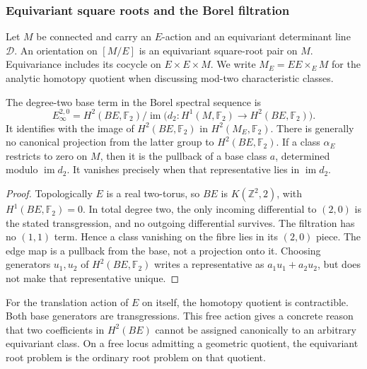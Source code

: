 \subsubsection*{Equivariant square roots and the Borel filtration}

Let \(M\) be connected and carry an \(E\)-action and an equivariant determinant line
\(\mathscr D\).  An orientation on \([M/E]\) is an equivariant
square-root pair on \(M\).  Equivariance includes its cocycle on
\(E\times E\times M\).  We write
\(M_E=EE\times_E M\) for the analytic homotopy quotient when discussing
mod-two characteristic classes.

\begin{proposition}
\label{prop:free-e-borel-class-criterion}
\label{prop:free-e-borel-vanishing-criterion}
The degree-two base term in the Borel spectral sequence is
\[
 E_\infty^{2,0}
 =H^2(BE,\mathbb F_2)/\operatorname{im}
 \bigl(d_2:H^1(M,\mathbb F_2)\to H^2(BE,\mathbb F_2)\bigr).
\]
It identifies with the image of \(H^2(BE,\mathbb F_2)\) in
\(H^2(M_E,\mathbb F_2)\).  There is generally no canonical projection
from the latter group to \(H^2(BE,\mathbb F_2)\).
If a class \(\alpha_E\) restricts to zero on \(M\), then it is the
pullback of a base class \(a\), determined modulo \(\operatorname{im}d_2\).
It vanishes precisely when that representative lies in
\(\operatorname{im}d_2\).
\end{proposition}
\begin{proof}
Topologically \(E\) is a real two-torus, so \(BE\) is
\(K(\mathbb Z^2,2)\), with \(H^1(BE,\mathbb F_2)=0\).
In total degree two, the only incoming differential to \((2,0)\) is
the stated transgression, and no outgoing differential survives.
The filtration has no \((1,1)\) term.  Hence a class vanishing on the
fibre lies in its \((2,0)\) piece.  The edge map is a pullback from the
base, not a projection onto it.  Choosing generators \(u_1,u_2\) of
\(H^2(BE,\mathbb F_2)\) writes a representative as
\(a_1u_1+a_2u_2\), but does not make that representative unique.
\end{proof}

For the translation action of \(E\) on itself, the homotopy quotient
is contractible.  Both base generators are transgressions.  This free
action gives a concrete reason that two coefficients in \(H^2(BE)\)
cannot be assigned canonically to an arbitrary equivariant class.
On a free locus admitting a geometric quotient, the equivariant root
problem is the ordinary root problem on that quotient.

